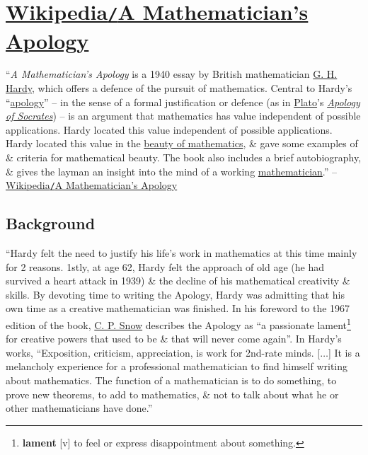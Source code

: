 \documentclass[oneside]{book}
\numberwithin{equation}{section}
\begin{document}
\section{\href{https://en.wikipedia.org/wiki/A_Mathematician's_Apology}{Wikipedia\texttt{/}A Mathematician's Apology}}
``\textit{A Mathematician's Apology} is a 1940 essay by British mathematician \href{https://en.wikipedia.org/wiki/G._H._Hardy}{G. H. Hardy}, which offers a defence of the pursuit of mathematics. Central to Hardy's ``\href{https://en.wikipedia.org/wiki/Apologetics}{apology}'' -- in the sense of a formal justification or defence (as in \href{https://en.wikipedia.org/wiki/Plato}{Plato}'s \href{https://en.wikipedia.org/wiki/Apology_(Plato)}{\textit{Apology of Socrates}}) -- is an argument that mathematics has value independent of possible applications. Hardy located this value independent of possible applications. Hardy located this value in the \href{https://en.wikipedia.org/wiki/Mathematical_beauty}{beauty of mathematics}, \& gave some examples of \& criteria for mathematical beauty. The book also includes a brief autobiography, \& gives the layman an insight into the mind of a working \href{https://en.wikipedia.org/wiki/Mathematician}{mathematician}.'' -- \href{https://en.wikipedia.org/wiki/A_Mathematician%27s_Apology}{Wikipedia\texttt{/}A Mathematician's Apology}

\subsection{Background}
``Hardy felt the need to justify his life's work in mathematics at this time mainly for 2 reasons. 1stly, at age 62, Hardy felt the approach of old age (he had survived a heart attack in 1939) \& the decline of his mathematical creativity \& skills. By devoting time to writing the Apology, Hardy was admitting that his own time as a creative mathematician was finished. In his foreword to the 1967 edition of the book, \href{https://en.wikipedia.org/wiki/C._P._Snow}{C. P. Snow} describes the Apology as ``a passionate lament\footnote{\textbf{lament} [v] to feel or express disappointment about something.} for creative powers that used to be \& that will never come again''. In Hardy's works, ``Exposition, criticism, appreciation, is work for 2nd-rate minds. [$\ldots$] It is a melancholy experience for a professional mathematician to find himself writing about mathematics. The function of a mathematician is to do something, to prove new theorems, to add to mathematics, \& not to talk about what he or other mathematicians have done.''
\end{document}
